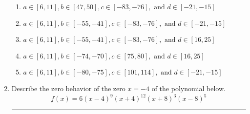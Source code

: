 \documentclass[14pt]{extbook}
\newcommand{\litem}[1]{\item#1\hspace*{-1cm}\rule{\textwidth}{0.4pt}}
\begin{document}
\begin{enumerate}
{\begin{enumerate}[label=\Alph*.]
\item \( a \in [6, 11], b \in [47, 50], c \in [-83, -76], \text{ and } d \in [-21, -15] \)
\item \( a \in [6, 11], b \in [-55, -41], c \in [-83, -76], \text{ and } d \in [-21, -15] \)
\item \( a \in [6, 11], b \in [-55, -41], c \in [-83, -76], \text{ and } d \in [16, 25] \)
\item \( a \in [6, 11], b \in [-74, -70], c \in [75, 80], \text{ and } d \in [16, 25] \)
\item \( a \in [6, 11], b \in [-80, -75], c \in [101, 114], \text{ and } d \in [-21, -15] \)

\end{enumerate} }
\litem{
Describe the zero behavior of the zero $x = -4$ of the polynomial below.\[ f(x) = 6(x - 4)^{9}(x + 4)^{12}(x + 8)^{3}(x - 8)^{5} \]\begin{enumerate}[label=\Alph*.]

\end{enumerate}}
\end{enumerate}
\end{document}
